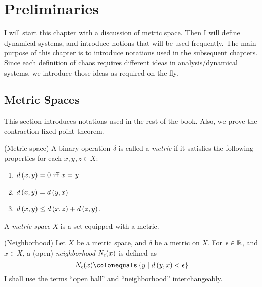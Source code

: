 \documentclass[12pt,twoside,draft]{book}
\begin{document}
\chapter{Preliminaries}
I will start this chapter with a discussion of metric space.
Then I will define dynamical systems, and introduce notions that will be used frequently.
The main purpose of this chapter is to introduce notations used in the subsequent chapters. 
Since each definition of chaos requires different ideas in analysis/dynamical systems, we introduce those ideas as required on the fly.

\section{Metric Spaces}
This section introduces notations used in the rest of the book.
Also, we prove the contraction fixed point theorem.

\begin{definition}
  (Metric space)
  A binary operation $\delta$ is called a \textit{metric} if it satisfies the following properties for each $x,y,z \in X$:
  \begin{enumerate}
    \item $d\left( x,y \right) = 0 \mbox{ iff } x = y$
    \item $d\left( x,y \right) = d\left( y,x \right)$
    \item $d\left( x,y \right) \leq d\left( x,z \right) + d\left( z,y \right)$.
  \end{enumerate}
  A \textit{metric space} $X$ is a set equipped with a metric.
\end{definition}
\begin{definition}
  (Neighborhood)
  Let $X$ be a metric space, and $\delta$ be a metric on $X$.
  For $\epsilon \in \mathbb{R}$, and $x \in X$, a (open) \textit{neighborhood} $N_{\epsilon}(x)$ is defined as 
  \begin{equation*}
    \oball{\epsilon}{x} \ceq \setst{y}{\metric{y,x} < \epsilon}
  \end{equation*}
  I shall use the terms ``open ball'' and ``neighborhood'' interchangeably.
\end{definition}
\end{document}
